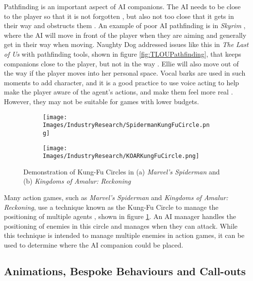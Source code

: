 \documentclass{IEEEtran}
\begin{document}
Pathfinding is an important aspect of AI companions. The AI needs to be close to the player so that it is not forgotten \cite{GAIP2EllieAI}, but also not too close that it gets in their way and obstructs them \cite{CoupledEmpowermentMaximisation}. An example of poor AI pathfinding is in \textit{Skyrim} \cite{tremblay2013adaptive}, where the AI will move in front of the player when they are aiming and generally get in their way when moving. Naughty Dog addressed issues like this in \textit{The Last of Us} with pathfinding tools, shown in figure \ref{fig:TLOUPathfinding}, that keeps companions close to the player, but not in the way \cite{GAIP2EllieAI}. Ellie will also move out of the way if the player moves into her personal space. Vocal barks are used in such moments to add character, and it is a good practice to use voice acting to help make the player aware of the agent’s actions, and make them feel more real \cite{GMTGoodAI}. However, they may not be suitable for games with lower budgets.

\begin{figure}
  \centering
  
  \begin{subfigure}[a]{\linewidth}
  \texttt{[image: Images/IndustryResearch/SpidermanKungFuCircle.png]}
  \end{subfigure}
  
  \begin{subfigure}[b]{\linewidth}
  \texttt{[image: Images/IndustryResearch/KOARKungFuCircle.png]}
  \end{subfigure}
  
  \caption{Demonstration of Kung-Fu Circles in (a) \textit{Marvel's Spiderman} and (b) \textit{Kingdoms of Amalur: Reckoning}}
  \label{fig:KungFuCircle}
\end{figure}

Many action games, such as \textit{Marvel's Spiderman} and \textit{Kingdoms of Amalur: Reckoning}, use a technique known as the Kung-Fu Circle to manage the positioning of multiple agents \cite{GAIPKungFuCircle, GDCSpiderman}, shown in figure \ref{fig:KungFuCircle}. An AI manager handles the positioning of enemies in this circle and manages when they can attack. While this technique is intended to manage multiple enemies in action games, it can be used to determine where the AI companion could be placed.

\subsection{Animations, Bespoke Behaviours and Call-outs}
\label{ABC}
\end{document}
